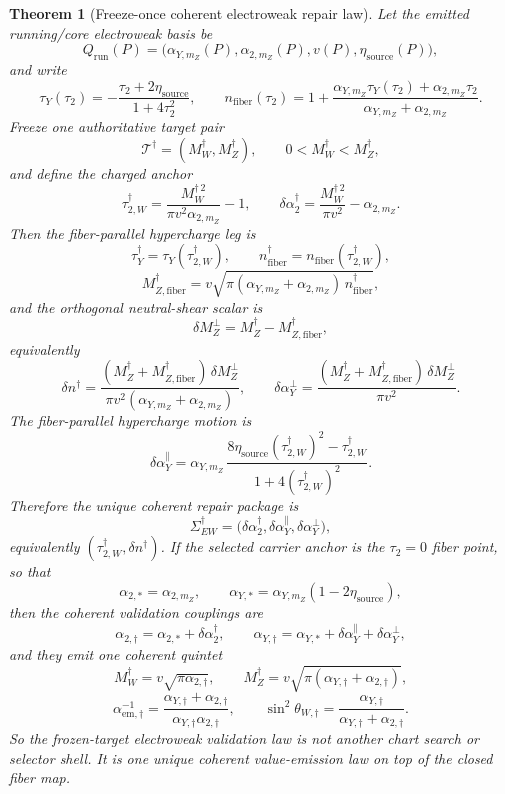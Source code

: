 \documentclass[11pt]{article}
\newtheorem{theorem}{Theorem}[section]
\begin{document}
\begin{theorem}[Freeze-once coherent electroweak repair law]
Let the emitted running/core electroweak basis be
\[
Q_{\mathrm{run}}(P)=
\bigl(\alpha_{Y,m_Z}(P),\alpha_{2,m_Z}(P),v(P),\eta_{\mathrm{source}}(P)\bigr),
\]
and write
\[
\tau_Y(\tau_2)
=
-\frac{\tau_2+2\eta_{\mathrm{source}}}{1+4\tau_2^2},
\qquad
n_{\mathrm{fiber}}(\tau_2)
=
1+\frac{\alpha_{Y,m_Z}\tau_Y(\tau_2)+\alpha_{2,m_Z}\tau_2}
{\alpha_{Y,m_Z}+\alpha_{2,m_Z}}.
\]
Freeze one authoritative target pair
\[
\mathcal T^\dagger=(M_W^\dagger,M_Z^\dagger),
\qquad 0<M_W^\dagger<M_Z^\dagger,
\]
and define the charged anchor
\[
\tau_{2,W}^\dagger
=
\frac{M_W^{\dagger\,2}}{\pi v^2\alpha_{2,m_Z}}-1,
\qquad
\delta\alpha_2^\dagger
=
\frac{M_W^{\dagger\,2}}{\pi v^2}-\alpha_{2,m_Z}.
\]
Then the fiber-parallel hypercharge leg is
\[
\tau_Y^\dagger=\tau_Y(\tau_{2,W}^\dagger),
\qquad
n_{\mathrm{fiber}}^\dagger=n_{\mathrm{fiber}}(\tau_{2,W}^\dagger),
\]
\[
M_{Z,\mathrm{fiber}}^\dagger
=
v\sqrt{\pi(\alpha_{Y,m_Z}+\alpha_{2,m_Z})\,n_{\mathrm{fiber}}^\dagger},
\]
and the orthogonal neutral-shear scalar is
\[
\delta M_Z^\perp=M_Z^\dagger-M_{Z,\mathrm{fiber}}^\dagger,
\]
equivalently
\[
\delta n^\dagger
=
\frac{(M_Z^\dagger+M_{Z,\mathrm{fiber}}^\dagger)\,\delta M_Z^\perp}
{\pi v^2(\alpha_{Y,m_Z}+\alpha_{2,m_Z})},
\qquad
\delta\alpha_Y^\perp
=
\frac{(M_Z^\dagger+M_{Z,\mathrm{fiber}}^\dagger)\,\delta M_Z^\perp}{\pi v^2}.
\]
The fiber-parallel hypercharge motion is
\[
\delta\alpha_Y^\parallel
=
\alpha_{Y,m_Z}\,
\frac{8\eta_{\mathrm{source}}(\tau_{2,W}^\dagger)^2-\tau_{2,W}^\dagger}
{1+4(\tau_{2,W}^\dagger)^2}.
\]
Therefore the unique coherent repair package is
\[
\Sigma_{EW}^\dagger
=
\bigl(\delta\alpha_2^\dagger,\delta\alpha_Y^\parallel,\delta\alpha_Y^\perp\bigr),
\]
equivalently \((\tau_{2,W}^\dagger,\delta n^\dagger)\). If the selected carrier anchor is the
\(\tau_2=0\) fiber point, so that
\[
\alpha_{2,*}=\alpha_{2,m_Z},
\qquad
\alpha_{Y,*}=\alpha_{Y,m_Z}(1-2\eta_{\mathrm{source}}),
\]
then the coherent validation couplings are
\[
\alpha_{2,\dagger}=\alpha_{2,*}+\delta\alpha_2^\dagger,
\qquad
\alpha_{Y,\dagger}=\alpha_{Y,*}+\delta\alpha_Y^\parallel+\delta\alpha_Y^\perp,
\]
and they emit one coherent quintet
\[
M_W^\dagger=v\sqrt{\pi\alpha_{2,\dagger}},
\qquad
M_Z^\dagger=v\sqrt{\pi(\alpha_{Y,\dagger}+\alpha_{2,\dagger})},
\]
\[
\alpha_{\mathrm{em},\dagger}^{-1}
=
\frac{\alpha_{Y,\dagger}+\alpha_{2,\dagger}}
{\alpha_{Y,\dagger}\alpha_{2,\dagger}},
\qquad
\sin^2\theta_{W,\dagger}
=
\frac{\alpha_{Y,\dagger}}{\alpha_{Y,\dagger}+\alpha_{2,\dagger}}.
\]
So the frozen-target electroweak validation law is not another chart search or selector shell. It is one
unique coherent value-emission law on top of the closed fiber map.
\end{theorem}
\end{document}
